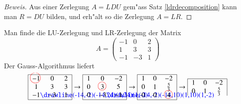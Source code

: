 \begin{proof}[Beweis]
Aus einer Zerlegung $A=LDU$ gem"ass Satz \ref{ldrdecomposition} kann man
$R=DU$ bilden, und erh"alt so die Zerlegung $A=LR$.
\end{proof}

\begin{beispiel}
Man finde die LU-Zerlegung und LR-Zerlegung der Matrix 
\[
A=\begin{pmatrix}
-1&0&2\\
1&3&3\\
-1&-3&1
\end{pmatrix}
\]
Der Gauss-Algorithmus liefert
\begin{align*}
\begin{tabular}{|>{$}c<{$}>{$}c<{$}>{$}c<{$}|}
\hline
-1%
\begin{picture}(0,0)
\color{red}\put(-7,4){\circle{15}}
\end{picture}%
&0&2\\
1&3&3\\
-1%
\begin{picture}(0,0)
\color{blue}\drawline(-14,-2)(-14,24)(1,24)(1,-2)
\end{picture}%
&-3&1\\
\hline
\end{tabular}
\rightarrow
\begin{tabular}{|>{$}c<{$}>{$}c<{$}>{$}c<{$}|}
\hline
1&0&-2\\
0&3%
\begin{picture}(0,0)
\color{red}\put(-3,4){\circle{12}}
\end{picture}%
&5\\
0&-3%
\begin{picture}(0,0)
\color{blue}\drawline(-14,-2)(-14,10)(1,10)(1,-2)
\end{picture}%
&-1\\
\hline
\end{tabular}
\rightarrow
\begin{tabular}{|>{$}c<{$}>{$}c<{$}>{$}c<{$}|}
\hline
1&0&-2\\
0&1&\frac53\\
0&0&4%
\begin{picture}(0,0)
\color{red}\put(-3,4){\circle{12}}
\end{picture}%
\\
\hline
\end{tabular}
\rightarrow
\begin{tabular}{|>{$}c<{$}>{$}c<{$}>{$}c<{$}|}
\hline
1&0&-2\\
0&1&\frac53\\

\end{tabular}
\end{align*}
\end{beispiel}
